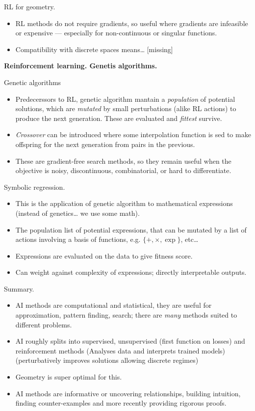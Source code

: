 \noindent
RL for geometry.
\begin{itemize}
\item RL methods do not require gradients,
so useful where gradients are infeasible or
expensive --- especially for non-continuous
or singular functions.
\item Compatibility with discrete spaces
means… [missing]
\end{itemize}

\medskip\noindent
{\bf Reinforcement learning. Genetis
algorithms.}

\medskip\noindent
Genetic algorithms
\begin{itemize}
\item Predecerssors to RL, genetic algorithm
mantain a {\it population} of potential
solutions, which are {\it mutated} by small
perturbations (alike RL actions) to produce
the next generation. These are evaluated and
{\it fittest} survive.
\item {\it Crossover} can be introduced
where some interpolation function is sed to
make offspring for the next generation from
pairs in the previous.
\item These are gradient-free search
methods, so they remain useful when the
objective is noisy, discontinuous,
combinatorial, or hard to differentiate.
\end{itemize}

\medskip\noindent
Symbolic regression.
\begin{itemize}
\item This is the application of genetic
algorithm to mathematical expressions
(instead of genetics… we use some math).
\item The population list of potential
expressions, that can be mutated by a list
of actions involving a basis of functions,
e.g. $\{+,\times,\operatorname{exp}\}$,
etc…
\item Expressions are evaluated on the data
to give fitness score.
\item Can weight against complexity of
expressions; directly interpretable outputs.
\end{itemize}

\medskip\noindent
Summary.

\begin{itemize}
\item AI methods are computational and
statistical, they are useful for
approximation, pattern finding, search;
there are {\it many} methods suited to
different problems.
\item AI roughly splits into supervised,
unsupervised (first function on losses) and
reinforcement methods (Analyses data and
interprets trained models)
(perturbatively improves solutions allowing
discrete regimes)
\item Geometry is super optimal for this.
\item AI methods are informative or
uncovering relationships, building
intuition, finding counter-examples and more
recently providing rigorous proofs.
\end{itemize}


